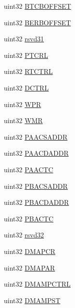 \begin{DoxyCompactItemize}
\item 
uint32 \mbox{\hyperlink{structdmaBase_a68dee6d40b8d0f7a7d3ff2c9968b9a14}{B\+T\+C\+B\+O\+F\+F\+S\+ET}}
\item 
uint32 \mbox{\hyperlink{structdmaBase_aea82adef5d350fafa78d3f1dbe4be489}{B\+E\+R\+B\+O\+F\+F\+S\+ET}}
\item 
uint32 \mbox{\hyperlink{structdmaBase_a9d5f84df9ad61c3a786aad4856aaf0e7}{rsvd31}}
\item 
uint32 \mbox{\hyperlink{structdmaBase_ab3cebac4b60664cfbae621eadb6aadf6}{P\+T\+C\+RL}}
\item 
uint32 \mbox{\hyperlink{structdmaBase_a9d0d4c827dca09570aff846faf4817a9}{R\+T\+C\+T\+RL}}
\item 
uint32 \mbox{\hyperlink{structdmaBase_a183c15583607608d4442edf491c1dd2d}{D\+C\+T\+RL}}
\item 
uint32 \mbox{\hyperlink{structdmaBase_a6794590df81c6e66215eefbf20bac984}{W\+PR}}
\item 
uint32 \mbox{\hyperlink{structdmaBase_a5f8c7cfdf49c28abc840fa9f93a82462}{W\+MR}}
\item 
uint32 \mbox{\hyperlink{structdmaBase_aabe83911e3f70446830de1e67d41540d}{P\+A\+A\+C\+S\+A\+D\+DR}}
\item 
uint32 \mbox{\hyperlink{structdmaBase_a68f19a970301d6736591b4c74d021a99}{P\+A\+A\+C\+D\+A\+D\+DR}}
\item 
uint32 \mbox{\hyperlink{structdmaBase_a87e2621af92ef0f7b5e38a16922a55de}{P\+A\+A\+C\+TC}}
\item 
uint32 \mbox{\hyperlink{structdmaBase_a4afdd58f8c93fd0ac00fef817503606b}{P\+B\+A\+C\+S\+A\+D\+DR}}
\item 
uint32 \mbox{\hyperlink{structdmaBase_aa1564eee99969bd5438fd229c1a8b24a}{P\+B\+A\+C\+D\+A\+D\+DR}}
\item 
uint32 \mbox{\hyperlink{structdmaBase_a79384a5b4027112b8d79911be59466a4}{P\+B\+A\+C\+TC}}
\item 
uint32 \mbox{\hyperlink{structdmaBase_a16ac26ca8dcbf80601d70f8e1ae758a6}{rsvd32}}
\item 
uint32 \mbox{\hyperlink{structdmaBase_aec7432dce6ada29c60a8a2d9877f3da1}{D\+M\+A\+P\+CR}}
\item 
uint32 \mbox{\hyperlink{structdmaBase_ae480b0ada7ad2fff8277f793bd7ab5e6}{D\+M\+A\+P\+AR}}
\item 
uint32 \mbox{\hyperlink{structdmaBase_a33249066c5b916593b27d751416a9f7f}{D\+M\+A\+M\+P\+C\+T\+RL}}
\item 
uint32 \mbox{\hyperlink{structdmaBase_a6c8287b7a515af17fc13ac11e082ac4e}{D\+M\+A\+M\+P\+ST}}

\end{DoxyCompactItemize}
